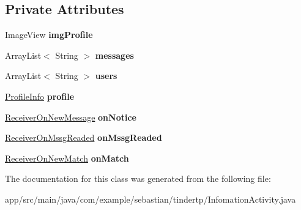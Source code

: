 \subsection*{Private Attributes}
\begin{DoxyCompactItemize}
\item 
Image\+View {\bfseries img\+Profile}\hypertarget{classcom_1_1example_1_1sebastian_1_1tindertp_1_1InfomationActivity_ac5e484df3a09b63fbe7e8136c9bc5ddc}{}\label{classcom_1_1example_1_1sebastian_1_1tindertp_1_1InfomationActivity_ac5e484df3a09b63fbe7e8136c9bc5ddc}

\item 
Array\+List$<$ String $>$ {\bfseries messages}\hypertarget{classcom_1_1example_1_1sebastian_1_1tindertp_1_1InfomationActivity_a6ef916d1ee85a5e724aa0508eb054215}{}\label{classcom_1_1example_1_1sebastian_1_1tindertp_1_1InfomationActivity_a6ef916d1ee85a5e724aa0508eb054215}

\item 
Array\+List$<$ String $>$ {\bfseries users}\hypertarget{classcom_1_1example_1_1sebastian_1_1tindertp_1_1InfomationActivity_a0d06765a5a335740368f8807237461dc}{}\label{classcom_1_1example_1_1sebastian_1_1tindertp_1_1InfomationActivity_a0d06765a5a335740368f8807237461dc}

\item 
\hyperlink{classcom_1_1example_1_1sebastian_1_1tindertp_1_1commonTools_1_1ProfileInfo}{Profile\+Info} {\bfseries profile}\hypertarget{classcom_1_1example_1_1sebastian_1_1tindertp_1_1InfomationActivity_a887210cd868a401c4a2e5edad7611da2}{}\label{classcom_1_1example_1_1sebastian_1_1tindertp_1_1InfomationActivity_a887210cd868a401c4a2e5edad7611da2}

\item 
\hyperlink{classcom_1_1example_1_1sebastian_1_1tindertp_1_1services_1_1ReceiverOnNewMessage}{Receiver\+On\+New\+Message} {\bfseries on\+Notice}\hypertarget{classcom_1_1example_1_1sebastian_1_1tindertp_1_1InfomationActivity_a2962ee17eae8e687e9cd37863a24ec17}{}\label{classcom_1_1example_1_1sebastian_1_1tindertp_1_1InfomationActivity_a2962ee17eae8e687e9cd37863a24ec17}

\item 
\hyperlink{classcom_1_1example_1_1sebastian_1_1tindertp_1_1services_1_1ReceiverOnMssgReaded}{Receiver\+On\+Mssg\+Readed} {\bfseries on\+Mssg\+Readed}\hypertarget{classcom_1_1example_1_1sebastian_1_1tindertp_1_1InfomationActivity_a6de4c7c2fd0323612eea8c9656aaaa91}{}\label{classcom_1_1example_1_1sebastian_1_1tindertp_1_1InfomationActivity_a6de4c7c2fd0323612eea8c9656aaaa91}

\item 
\hyperlink{classcom_1_1example_1_1sebastian_1_1tindertp_1_1services_1_1ReceiverOnNewMatch}{Receiver\+On\+New\+Match} {\bfseries on\+Match}\hypertarget{classcom_1_1example_1_1sebastian_1_1tindertp_1_1InfomationActivity_abb5e767c612ad2c32f40990397362e2f}{}\label{classcom_1_1example_1_1sebastian_1_1tindertp_1_1InfomationActivity_abb5e767c612ad2c32f40990397362e2f}

\end{DoxyCompactItemize}


The documentation for this class was generated from the following file\+:\begin{DoxyCompactItemize}
\item 
app/src/main/java/com/example/sebastian/tindertp/Infomation\+Activity.\+java\end{DoxyCompactItemize}
